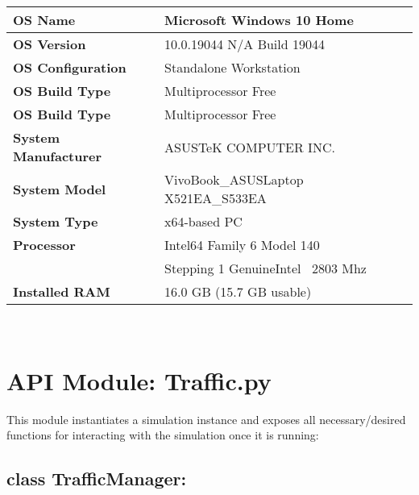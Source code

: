 \begin{center}
    \noindent \begin{tabular}{l l}  %
    \toprule
    \textbf{OS Name} & Microsoft Windows 10 Home\\
    \midrule
    \textbf{OS Version} & 10.0.19044 N/A Build 19044\\
    \midrule
    \textbf{OS Configuration} & Standalone Workstation\\
    \midrule
    \textbf{OS Build Type} & Multiprocessor Free\\
    \midrule
    \textbf{OS Build Type} & Multiprocessor Free\\
    \midrule
    \textbf{System Manufacturer} & ASUSTeK COMPUTER INC.\\
    \midrule
    \textbf{System Model} & VivoBook\_ASUSLaptop X521EA\_S533EA\\
    \midrule
    \textbf{System Type} &  x64-based PC\\
    \midrule
    \textbf{Processor} & Intel64 Family 6 Model 140 \\
    & Stepping 1 GenuineIntel ~2803 Mhz \\
    \midrule
    \textbf{Installed RAM} & 16.0 GB (15.7 GB usable)\\
    \bottomrule
    \end{tabular}
\end{center}
 \\
 
\section{API Module: Traffic.py}
This module instantiates a simulation instance and exposes all necessary/desired functions for interacting with the simulation once it is running:

\subsection{class TrafficManager:}

